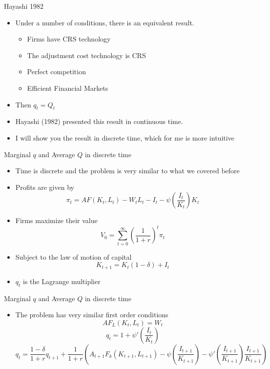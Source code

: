 \documentclass[11pt,aspectratio=169,xcolor={dvipsnames},hyperref={pdftex,pdfpagemode=UseNone,hidelinks,pdfdisplaydoctitle=true},usepdftitle=false]{beamer}
\begin{document}
\begin{frame}{Hayashi 1982}
\begin{itemize}
\item Under a number of conditions, there is an equivalent result.
\begin{itemize}
\item Firms have CRS technology
\item The adjustment cost technology is CRS
\item Perfect competition
\item Efficient Financial Markets
\end{itemize}
\item Then $q_t = Q_t$
\item Hayashi (1982) presented this result in continuous time.
\item I will show you the result in discrete time, which for me is more intuitive
\end{itemize}
\end{frame}


\begin{frame}{Marginal $q$ and Average $Q$ in discrete time}
\begin{itemize}
\item Time is discrete and the problem is very similar to what we covered before
\pause
\item Profits are given by
$$\pi_t = AF(K_t,L_t) - W_t L_t - I_t - \psi \left(\frac{I_t}{K_t}\right) K_t$$
\vspace{-0.5cm}
\item Firms maximize their value
$$V_0 = \sum_{t=0}^{\infty} \left(\frac{1}{1+r}\right)^{t} \pi_t$$
\vspace{-0.5cm}
\pause
\item Subject to the law of motion of capital
$$K_{t+1} = K_t(1-\delta) + I_t$$
\vspace{-0.5cm}
\item $q_t$ is the Lagrange multiplier
\end{itemize}
\end{frame}

\begin{frame}{Marginal $q$ and Average $Q$ in discrete time}
\begin{itemize}
\item The problem has very similar first order conditions
$$AF_L(K_t,L_t) = W_t$$
$$q_t = 1 + \psi' \left(\frac{I_t}{K_t}\right)$$
$$q_t = \frac{1-\delta}{1+r} q_{t+1} + \frac{1}{1+r} \left(A_{t+1} F_k(K_{t+1},L_{t+1}) - \psi \left(\frac{I_{t+1}}{K_{t+1}}\right) - \psi' \left(\frac{I_{t+1}}{K_{t+1}}\right) \frac{I_{t+1}}{K_{t+1}}\right)$$
\end{itemize}
\end{frame}
\end{document}
